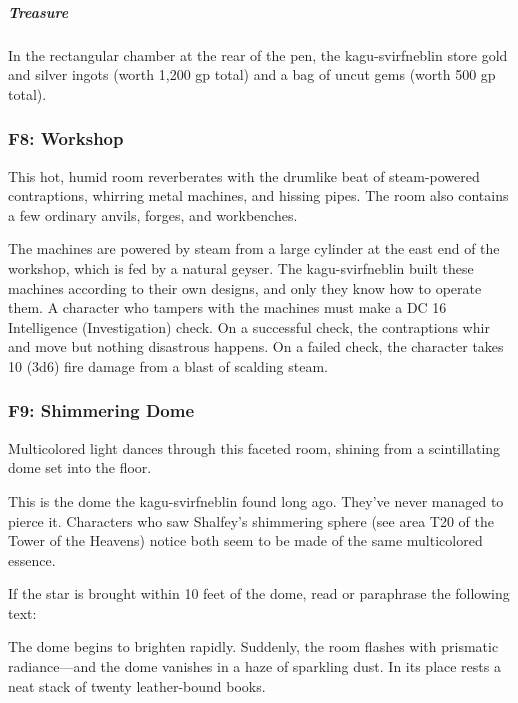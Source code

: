 \documentclass[10pt,a4paper,twoside,bg=print,twocolumn,openany,nodeprecatedcode]{dndbook}
\begin{document}
\subparagraph{Treasure}
In the rectangular chamber at the rear of the pen, the kagu-svirfneblin store gold and silver ingots (worth 1,200 gp total) and a bag of uncut gems (worth 500 gp total).

\subsubsection{F8: Workshop}
\begin{DndReadAloud}{}
This hot, humid room reverberates with the drumlike beat of steam-powered contraptions, whirring metal machines, and hissing pipes. The room also contains a few ordinary anvils, forges, and workbenches.

\end{DndReadAloud}

The machines are powered by steam from a large cylinder at the east end of the workshop, which is fed by a natural geyser. The kagu-svirfneblin built these machines according to their own designs, and only they know how to operate them. A character who tampers with the machines must make a DC 16 Intelligence (Investigation) check. On a successful check, the contraptions whir and move but nothing disastrous happens. On a failed check, the character takes 10 (3d6) fire damage from a blast of scalding steam.

\subsubsection{F9: Shimmering Dome}
\begin{DndReadAloud}{}
Multicolored light dances through this faceted room, shining from a scintillating dome set into the floor.

\end{DndReadAloud}

This is the dome the kagu-svirfneblin found long ago. They've never managed to pierce it. Characters who saw Shalfey's shimmering sphere (see area T20 of the Tower of the Heavens) notice both seem to be made of the same multicolored essence.

If the star is brought within 10 feet of the dome, read or paraphrase the following text:

\begin{DndReadAloud}{}
The dome begins to brighten rapidly. Suddenly, the room flashes with prismatic radiance—and the dome vanishes in a haze of sparkling dust. In its place rests a neat stack of twenty leather-bound books.

\end{DndReadAloud}
\end{document}
